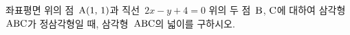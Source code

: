 좌표평면 위의 점~$\mathrm{A}(1,\,1)$과 직선~$2x-y+4=0$ 위의 두 점~$\mathrm{B}$, $\mathrm{C}$에 대하여 삼각형~$\mathrm{ABC}$가 정삼각형일 때, 삼각형~$\mathrm{ABC}$의 넓이를 구하시오.
